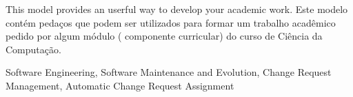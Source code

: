 This model provides an userful way to develop your academic work. Este modelo contém pedaços que podem ser utilizados para formar um trabalho acadêmico pedido por algum módulo ( componente curricular) do curso de Ciência da Computação.

\begin{keywords}
Software Engineering, Software Maintenance and Evolution, Change Request
Management, Automatic Change Request Assignment
\end{keywords}